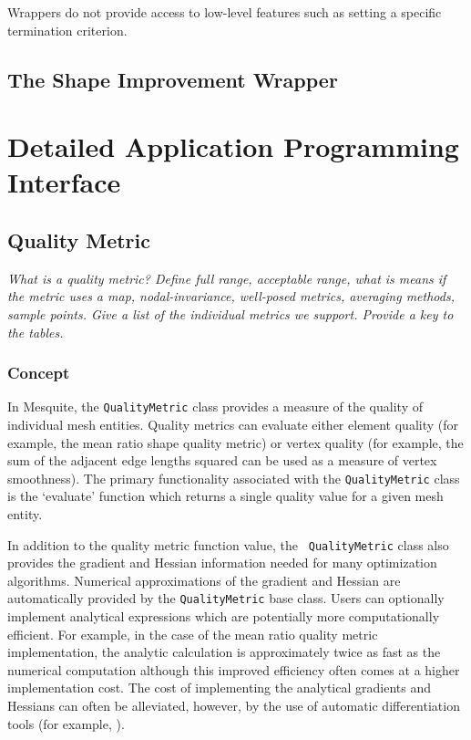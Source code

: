 \documentclass[letter]{report}
\begin{document}
Wrappers do not provide access to low-level 
features such as setting a specific
termination criterion.  

\subsection{The Shape Improvement Wrapper}


\section{Detailed Application Programming Interface}
\label{sec:detailedAPI}

\subsection{Quality Metric}

{\it 
What is a quality metric? Define full range, acceptable range, what is means 
if the metric uses a map, nodal-invariance, well-posed metrics, averaging 
methods, sample points. Give a list of the individual metrics we support. 
Provide a key to the tables.
}

\subsubsection{Concept}

In Mesquite, the \texttt{QualityMetric} class provides a measure of
the quality of individual mesh entities.  Quality metrics can evaluate
either element quality (for example, the mean ratio shape quality
metric) or vertex quality (for example, the sum of the adjacent edge
lengths squared can be used as a measure of vertex smoothness).  
The primary functionality associated with the {\tt QualityMetric}
class is the `evaluate' function which returns a single quality value
for a given mesh entity.

In addition to the quality metric function value, the {\tt
QualityMetric} class also provides the gradient and Hessian
information needed for many optimization algorithms.  Numerical
approximations of the gradient and Hessian are automatically provided
by the \texttt{QualityMetric} base class.  Users can optionally
implement analytical expressions which are potentially more
computationally efficient.  For example, in the case of the mean ratio
quality metric implementation, the analytic calculation is
approximately twice as fast as the numerical computation although this
improved efficiency often comes at a higher implementation cost.  The
cost of implementing the analytical gradients and Hessians can often
be alleviated, however, by the use of automatic differentiation tools
(for example, \cite{bischofadic}).
\end{document}
